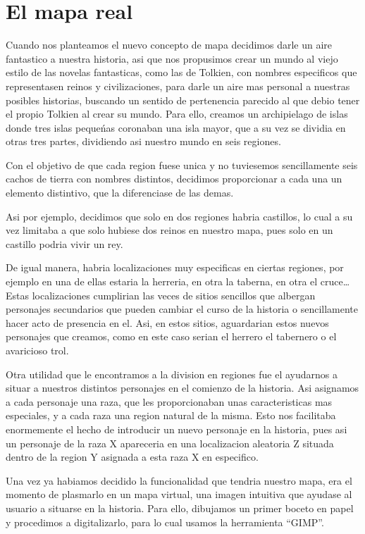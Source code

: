 \section{El mapa real}

Cuando nos planteamos el nuevo concepto de mapa decidimos darle un aire fantastico a nuestra historia, asi que nos propusimos crear un mundo al viejo estilo de las novelas fantasticas, como las de Tolkien, con nombres especificos que representasen reinos y civilizaciones, para darle un aire mas personal a nuestras posibles historias, buscando un sentido de pertenencia parecido al que debio tener el propio Tolkien al crear su mundo.
Para ello, creamos un archipielago de islas donde tres islas peque\'nas coronaban una isla mayor,  que a su vez se dividia en otras tres partes, dividiendo asi nuestro mundo en seis regiones.

Con el objetivo de que cada region fuese unica y no tuviesemos sencillamente seis cachos de tierra con nombres distintos, decidimos proporcionar a cada una un elemento distintivo, que la diferenciase de las demas. 

Asi por ejemplo, decidimos que solo en dos regiones habria castillos, lo cual a su vez limitaba a que solo hubiese dos reinos en nuestro mapa, pues solo en un castillo podria vivir un rey.

De igual manera, habria localizaciones muy especificas en ciertas regiones, por ejemplo en una de ellas estaria la herreria, en otra la taberna, en otra el cruce…Estas localizaciones cumplirian las veces de sitios sencillos que albergan personajes secundarios que pueden cambiar el curso de la historia o sencillamente hacer acto de presencia en el. Asi, en estos sitios, aguardarian estos nuevos personajes que creamos, como en este caso serian el herrero el tabernero o el avaricioso trol.

Otra utilidad que le encontramos a la division en regiones fue el ayudarnos a situar a nuestros distintos personajes en el comienzo de la historia. Asi asignamos a cada personaje una raza, que les proporcionaban unas caracteristicas mas especiales, y a cada raza una region natural de la misma. Esto nos facilitaba enormemente el hecho de introducir un nuevo personaje en la historia, pues asi un personaje de la raza X apareceria en una localizacion aleatoria Z situada dentro de la region Y asignada a esta raza X en especifico.

Una vez ya habiamos decidido la funcionalidad que tendria nuestro mapa, era el momento de plasmarlo en un mapa virtual, una imagen intuitiva que ayudase al usuario a situarse en la historia. Para ello, dibujamos un primer boceto en papel y procedimos a digitalizarlo, para lo cual usamos la herramienta “GIMP”.

